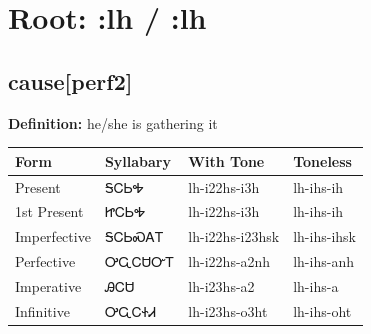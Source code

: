 \documentclass{article}%
\begin{document}
%
\normalsize%
\section*{Root: :lh / :lh}%
\subsection*{cause[perf2]}%
\textbf{Definition: }%
he/she is gathering it%
\\[0.5em]%
\begin{tabular}{|l|l|l|l|}%
\hline%
\textbf{Form}&\textbf{Syllabary}&\textbf{With Tone}&\textbf{Toneless}\\%
\hline%
Present&ᎦᏟᏏᎭ&lh{-}i22hs{-}i3h&lh{-}ihs{-}ih\\%
1st Present&ᏥᏟᏏᎭ&lh{-}i22hs{-}i3h&lh{-}ihs{-}ih\\%
Imperfective&ᎦᏟᏏᏍᎪᎢ&lh{-}i22hs{-}i23hsk&lh{-}ihs{-}ihsk\\%
Perfective&ᎤᏩᏟᏌᏅᎢ&lh{-}i22hs{-}a2nh&lh{-}ihs{-}anh\\%
Imperative&ᎯᏟᏌ&lh{-}i23hs{-}a2&lh{-}ihs{-}a\\%
Infinitive&ᎤᏩᏟᏐᏗ&lh{-}i23hs{-}o3ht&lh{-}ihs{-}oht\\%
\hline%
\end{tabular}%
\\[1em]%
\end{document}
